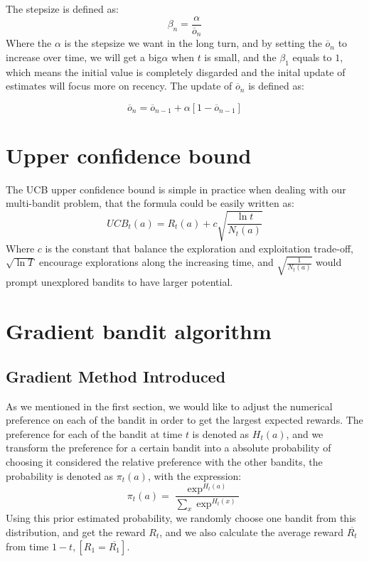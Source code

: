 \documentclass{article}
\begin{document}
The stepsize is defined as: 
\begin{equation}
    \beta_n = \dfrac{\alpha}{\overline{o}_n}
\end{equation}
Where the $\alpha$ is the stepsize we want in the long turn, and by setting the $\overline{o}_n$ to increase over time,
we will get a big$\alpha$ when $t$ is small, and the $\beta_1$ equals to $1$, which means the initial value is completely
disgarded and the inital update of estimates will focus more on recency. The update of $\overline{o}_n$ is defined as:

\begin{equation}
    \overline{o}_n = \overline{o}_{n-1} + \alpha[1-\overline{o}_{n-1}]
\end{equation}
\section{Upper confidence bound}
The UCB upper confidence bound is simple in practice when dealing with our multi-bandit problem, that the 
formula could be easily written as:
\begin{equation}
    UCB_t(a) = R_t(a) + c\sqrt{\frac{\ln t}{N_t(a)}}
\end{equation}
Where $c$ is the constant that balance the exploration and exploitation trade-off, $\sqrt{\ln T}$ encourage 
explorations along the increasing time, and $\sqrt{\frac{1}{N_t(a)}}$ would prompt unexplored bandits to have
larger potential. 
\section{Gradient bandit algorithm}
\subsection{Gradient Method Introduced}
As we mentioned in the first section, we would like to adjust the numerical preference on each of the bandit
in order to get the largest expected rewards. The preference for each of the bandit at time $t$ is denoted as $H_t(a)$,
and we transform the preference for a certain bandit into a absolute probability of choosing it considered 
the relative preference with the other bandits, the probability is denoted as $\pi_t(a)$, with the expression:
\begin{equation}
    \pi_t(a) = \dfrac{\exp^{H_t(a)}}{\sum_x \exp^{H_t(x)}}
\end{equation}
Using this prior estimated probability, we randomly choose one bandit from this distribution, and get the
reward $R_t$, and we also calculate the average reward $\overline{R_t}$ from time $1-t, [R_{1}=\overline{R_1}]$.
\end{document}
